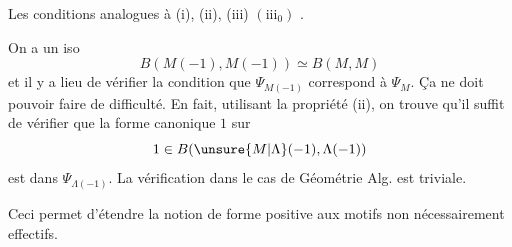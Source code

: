 Les conditions  analogues à (i), (ii), (iii)
$(\mathrm{iii}_0)$ .

On a un iso
\[
B(M(-1),M(-1))\simeq B(M,M)
\]
et il y a lieu de vérifier la condition que $\Psi_{M(-1)}$ correspond à
$\Psi_M$. Ça ne doit pouvoir faire de difficulté.
En fait, utilisant la propriété (ii), on trouve qu'il suffit de vérifier que
la forme canonique $1$ sur
\[
1\in B(\unsure{M|\Lambda}(-1),\Lambda(-1))
\]
est dans $\Psi_{\Lambda(-1)}$.
 La vérification dans le cas de Géométrie Alg. est triviale.

Ceci permet d'étendre la notion de forme 
positive aux motifs non nécessairement effectifs.
